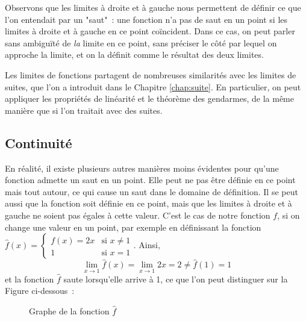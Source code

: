 Observons que les limites à droite et à gauche nous permettent de définir ce que l'on entendait par un "saut"~: une fonction n'a pas de saut en un point si les limites à droite et à gauche en ce point coïncident. Dans ce cas, on peut parler sans ambiguïté de \emph{la} limite en ce point, sans préciser le côté par lequel on approche la limite, et on la définit comme le résultat des deux limites.

Les limites de fonctions partagent de nombreuses similarités avec les limites de suites, que l'on a introduit dans le Chapitre \ref{chap:suite}. En particulier, on peut appliquer les propriétés de linéarité et le théorème des gendarmes, de la même manière que si l'on traitait avec des suites.

\subsection{Continuité}
En réalité, il existe plusieurs autres manières moins évidentes pour qu'une fonction admette un saut en un point. Elle peut ne pas être définie en ce point mais tout autour, ce qui cause un saut dans le domaine de définition. Il se peut aussi que la fonction soit définie en ce point, mais que les limites à droite et à gauche ne soient pas égales à cette valeur. C'est le cas de notre fonction $f$, si on change une valeur en un point, par exemple en définissant la fonction $\hat{f}(x) = \begin{cases} f(x) = 2x & \textrm{si } x \neq 1 \\ 1 & \textrm{si } x = 1 \end{cases}$.
Ainsi, 
\begin{equation}
\lim_{x \to 1} \hat{f}(x) = \lim_{x \to 1} 2x = 2 \neq \hat{f}(1) = 1
\end{equation}
et la fonction $\hat{f}$ saute lorsqu'elle arrive à 1, ce que l'on peut distinguer sur la Figure ci-dessous~:
\begin{figure}[H]
    \centering
    \caption{Graphe de la fonction $\hat{f}$}
    \label{fig:function_jump}
\end{figure}


